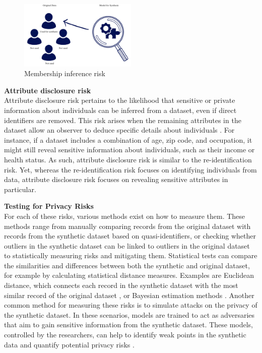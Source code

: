 \vspace{10pt}
\begin{figure}[H]
    \centering
    \includegraphics[width=0.5\textwidth]{Images/membershipinference.png}
    \caption{Membership inference risk}
    \label{fig:synthesis_1}
\end{figure}
\vspace{10pt}

\textbf{Attribute disclosure risk}\\
Attribute disclosure risk pertains to the likelihood that sensitive or private information about individuals can be inferred from a dataset, even if direct identifiers are removed. This risk arises when the remaining attributes in the dataset allow an observer to deduce specific details about individuals \cite{hittmeir2020baseline}. For instance, if a dataset includes a combination of age, zip code, and occupation, it might still reveal sensitive information about individuals, such as their income or health status. As such, attribute disclosure risk is similar to the re-identification risk. Yet, whereas the re-identification risk focuses on identifying individuals from data, attribute disclosure risk focuses on revealing sensitive attributes in particular. 

\textbf{Testing for Privacy Risks}\\
For each of these risks, various methods exist on how to measure them. These methods range from manually comparing records from the original dataset with records from the synthetic dataset based on quasi-identifiers, or checking whether outliers in the synthetic dataset can be linked to outliers in the original dataset to statistically measuring risks and mitigating them. Statistical tests can compare the similarities and differences between both the synthetic and original dataset, for example by calculating statistical distance measures. Examples are Euclidean distance, which connects each record in the synthetic dataset with the most similar record of the original dataset \cite{hittmeir2019utility}, or Bayesian estimation methods \cite{hu2018bayesian}. Another common method for measuring these risks is to simulate attacks on the privacy of the synthetic dataset. In these scenarios, models are trained to act as adversaries that aim to gain sensitive information from the synthetic dataset. These models, controlled by the researchers, can help to identify weak points in the synthetic data and quantify potential privacy risks \cite{boudewijn2023privacy,van2023membership,hittmeir2020baseline}.

